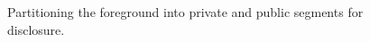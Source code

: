 \begin{figure}[t]
  \begin{center}
    
    \caption{Partitioning the foreground into private and public segments for disclosure.}
    \label{fig:private}
  \end{center}
\end{figure}

